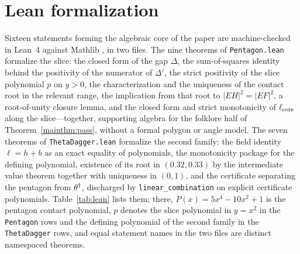 \FloatBarrier
\section{Lean formalization}\label{app:lean}

Sixteen statements forming the algebraic core of the paper are machine-checked in Lean~4 against Mathlib \cite{mathlib2020}, in two files. The nine theorems of \texttt{Pentagon.lean} formalize the slice: the closed form of the gap $\Delta$, the sum-of-squares identity behind the positivity of the numerator of $\Delta'$, the strict positivity of the slice polynomial $p$ on $y>0$, the characterization and the uniqueness of the contact root in the relevant range, the implication from that root to $|EH|^2=|EF|^2$, a root-of-unity closure lemma, and the closed form and strict monotonicity of $\ell_{\mathrm{core}}$ along the slice---together, supporting algebra for the folklore half of Theorem~\ref{mainthm:pass}, without a formal polygon or angle model. The seven theorems of \texttt{ThetaDagger.lean} formalize the second family: the field identity $\ell=h+b$ as an exact equality of polynomials, the monotonicity package for the defining polynomial, existence of its root in $(0.32,0.33)$ by the intermediate value theorem together with uniqueness in $(0,1)$, and the certificate separating the pentagon from $\theta^\dagger$, discharged by \texttt{linear\_combination} on explicit certificate polynomials. Table~\ref{tab:lean} lists them; there, $P(x)=5x^4-10x^2+1$ is the pentagon contact polynomial, $p$ denotes the slice polynomial in $y=x^2$ in the \texttt{Pentagon} rows and the defining polynomial of the second family in the \texttt{ThetaDagger} rows, and equal statement names in the two files are distinct namespaced theorems.

